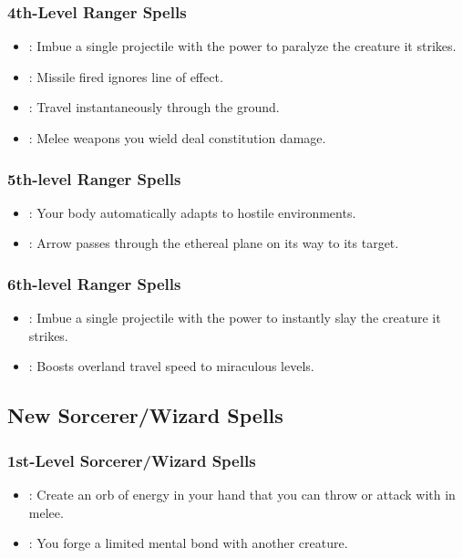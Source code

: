 \subsubsection{4th-Level Ranger Spells}
\begin{itemize}
 \item {}: Imbue a single projectile with the power to paralyze the creature it strikes.
 \item {}: Missile fired ignores line of effect.
 \item {}: Travel instantaneously through the ground.
 \item {}: Melee weapons you wield deal constitution damage.
\end{itemize}

\subsubsection{5th-level Ranger Spells}
\begin{itemize}
 \item {}: Your body automatically adapts to hostile environments.
 \item {}: Arrow passes through the ethereal plane on its way to its target.
\end{itemize}

\subsubsection{6th-level Ranger Spells}
\begin{itemize}
\item {}: Imbue a single projectile with the power to instantly slay the creature it strikes.
\item {}: Boosts overland travel speed to miraculous levels.
\end{itemize}

\subsection{New Sorcerer/Wizard Spells}
\subsubsection{1st-Level Sorcerer/Wizard Spells}
\begin{itemize}
 \item {}: Create an orb of energy in your hand that you can throw or attack with in melee.
 \item {}: You forge a limited mental bond with another creature.
\end{itemize}


